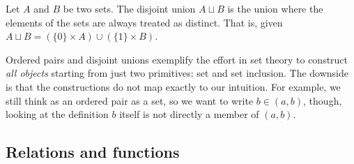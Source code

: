 \documentclass{article}
\begin{document}
\begin{defn}
	Let $A$ and $B$ be two sets. The disjoint union $A \sqcup B$ is the union where the elements of the sets are always treated as distinct. That is, given $A \sqcup B = (\{0\} \times A ) \cup ( \{1\} \times B )$.
\end{defn}

\begin{remark}
	Ordered pairs and disjoint unions exemplify the effort in set theory to construct \emph{all objects} starting from just two primitives: set and set inclusion. The downside is that the constructions do not map exactly to our intuition. For example, we still think as an ordered pair as a set, so we want to write $b \in (a, b)$, though, looking at the definition $b$ itself is not directly a member of $(a, b)$.
\end{remark}

\subsection{Relations and functions}
\end{document}
